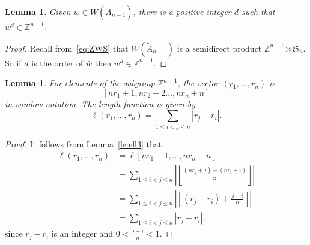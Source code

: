 \documentclass[12pt]{amsart}
\renewcommand{\le}{\leqslant}
\newcommand{\sym}[1]{\mathfrak{S}_{#1}}
\newcommand{\bZ}{{\mathbb{Z}}}
\numberwithin{equation}{section}
\newtheorem{lemma}[equation]{Lemma}
\theoremstyle{definition}
\begin{document}
\begin{lemma}\label{le:power}
Given $w\in W(\tilde A_{n-1})$, there is a positive integer $d$ such
that $w^d\in\bZ^{n-1}$.
\end{lemma}
\begin{proof}
Recall from~\eqref{eq:ZWS} that $W(\tilde A_{n-1})$ is a semidirect product
$\bZ^{n-1}\rtimes\sym{n}$. So if $d$ is the order of $\bar w$ then
$w^d\in\bZ^{n-1}$. 
\end{proof}

\begin{lemma}\label{le:ell4}
For elements of the subgroup $\bZ^{n-1}$, the vector $(r_1,\dots,r_n)$
is 
\[ [nr_1+1,nr_2+2\dots,nr_n+n] \]
in window notation. The length function is given by  
\begin{equation*}
 \ell(r_1,\dots,r_n)=\sum_{1\le i<j\le n}|r_j-r_i|. 
\end{equation*}
\end{lemma}
\begin{proof}
It follows from Lemma~\ref{le:ell3} that
\begin{align*}
\ell(r_1,\dots,r_n)&=\ell[nr_1+1,\dots,nr_n+n]\\
&=\sum_{1\le i<j\le n}
\left|\left\lfloor\frac{(nr_j+j)-(nr_i+i)}{n}\right\rfloor\right| \\
&=\sum_{1\le i<j\le n}
\left|\left\lfloor (r_j-r_i) + \frac{j-i}{n}\right\rfloor\right| \\
&=\sum_{1\le i<j\le n}|r_j-r_i|,
\end{align*}
since $r_j-r_i$ is an integer and $0< \frac{j-i}{n}<1$.
\end{proof}
\end{document}
